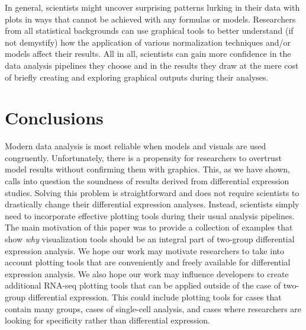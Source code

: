 \documentclass{bmcart}
\begin{document}
\begin{linenumbers}
\begin{doublespacing}
In general, scientists might uncover surprising patterns lurking in their data with plots in ways that cannot be achieved with any formulas or models. Researchers from all statistical backgrounds can use graphical tools to better understand (if not demystify) how the application of various normalization techniques and/or models affect their results. All in all, scientists can gain more confidence in the data analysis pipelines they choose and in the results they draw at the mere cost of briefly creating and exploring graphical outputs during their analyses.

\section*{Conclusions}

Modern data analysis is most reliable when models and visuals are used congruently. Unfortunately, there is a propensity for researchers to overtrust model results without confirming them with graphics. This, as we have shown, calls into question the soundness of results derived from differential expression studies. Solving this problem is straightforward and does not require scientists to drastically change their differential expression analyses. Instead, scientists simply need to incorporate effective plotting tools during their usual analysis pipelines. The main motivation of this paper was to provide a collection of examples that show \textit{why} visualization tools should be an integral part of two-group differential expression analysis. We hope our work may motivate researchers to take into account plotting tools that are conveniently and freely available for differential expression analysis. We also hope our work may influence developers to create additional RNA-seq plotting tools that can be applied outside of the case of two-group differential expression. This could include plotting tools for cases that contain many groups, cases of single-cell analysis, and cases where researchers are looking for specificity rather than differential expression. 


\end{doublespacing}
\end{linenumbers}
\end{document}
